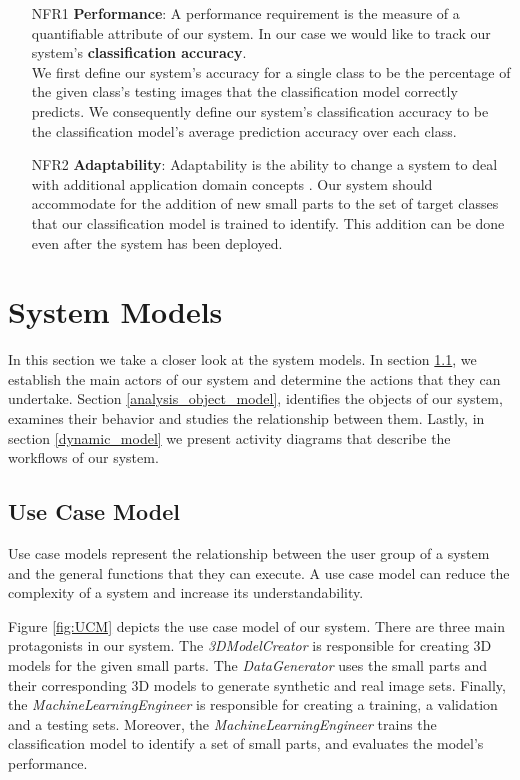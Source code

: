 \begin{itemize}
  \item [NFR1] \textbf{Performance}: A performance requirement is the measure of a quantifiable attribute of our system. In our case we would like to track our system's \textbf{classification accuracy}.
  \\We first define our system's accuracy for a single class to be the percentage of the given class's testing images that the classification model correctly predicts. We consequently define our system's classification accuracy to be the classification model's average prediction accuracy over each class.

  \item [NFR2] \textbf{Adaptability}: Adaptability is the ability to change a system to deal with additional application domain concepts \cite{bruegge2004object}. Our system should accommodate for the addition of new small parts to the set of target classes that our classification model is trained to identify. This addition can be done even after the system has been deployed.
\end{itemize}


\section{System Models}\label{system_models}

In this section we take a closer look at the system models. In section \ref{use_case_model}, we establish the main actors of our system and determine the actions that they can undertake. Section \ref{analysis_object_model}, identifies the objects of our system, examines their behavior and studies the relationship between them. Lastly, in section \ref{dynamic_model} we present activity diagrams that describe the workflows of our system.

\subsection{Use Case Model}\label{use_case_model}
Use case models represent the relationship between the user group of a system and the general functions that they can execute. A use case model can reduce the complexity of a system and increase its understandability.

Figure \ref{fig:UCM} depicts the use case model of our system. There are three main protagonists in our system. The \textit{3DModelCreator} is responsible for creating 3D models for the given small parts. The \textit{DataGenerator} uses the small parts and their corresponding 3D models to generate synthetic and real image sets. Finally, the \textit{MachineLearningEngineer} is responsible for creating a training, a validation and a testing sets. Moreover, the \textit{MachineLearningEngineer} trains the classification model to identify a set of small parts, and evaluates the model's performance.

